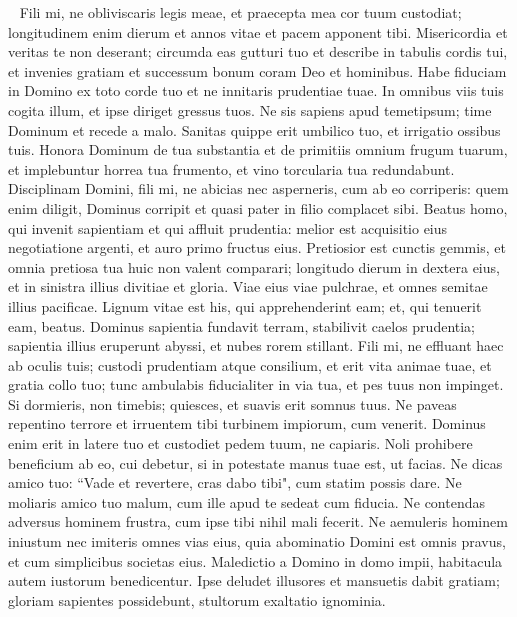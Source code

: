 \begin{biblechapter}   
\verse Fili mi, ne obliviscaris legis meae, et praecepta mea cor tuum custodiat; 
\verse longitudinem enim dierum et annos vitae et pacem apponent tibi. 
\verse Misericordia et veritas te non deserant; circumda eas gutturi tuo et describe in tabulis cordis tui, 
\verse et invenies gratiam et successum bonum coram Deo et hominibus. 
\verse Habe fiduciam in Domino ex toto corde tuo et ne innitaris prudentiae tuae. 
\verse In omnibus viis tuis cogita illum, et ipse diriget gressus tuos. 
\verse Ne sis sapiens apud temetipsum; time Dominum et recede a malo. 
\verse Sanitas quippe erit umbilico tuo, et irrigatio ossibus tuis. 
\verse Honora Dominum de tua substantia et de primitiis omnium frugum tuarum, 
\verse et implebuntur horrea tua frumento, et vino torcularia tua redundabunt. 
\verse Disciplinam Domini, fili mi, ne abicias nec asperneris, cum ab eo corriperis: 
\verse quem enim diligit, Dominus corripit et quasi pater in filio complacet sibi. 
\verse Beatus homo, qui invenit sapientiam et qui affluit prudentia: 
\verse melior est acquisitio eius negotiatione argenti, et auro primo fructus eius. 
\verse Pretiosior est cunctis gemmis, et omnia pretiosa tua huic non valent comparari; 
\verse longitudo dierum in dextera eius, et in sinistra illius divitiae et gloria. 
\verse Viae eius viae pulchrae, et omnes semitae illius pacificae. 
\verse Lignum vitae est his, qui apprehenderint eam; et, qui tenuerit eam, beatus. 
\verse Dominus sapientia fundavit terram, stabilivit caelos prudentia; 
\verse sapientia illius eruperunt abyssi, et nubes rorem stillant. 
\verse Fili mi, ne effluant haec ab oculis tuis; custodi prudentiam atque consilium, 
\verse et erit vita animae tuae, et gratia collo tuo; 
\verse tunc ambulabis fiducialiter in via tua, et pes tuus non impinget. 
\verse Si dormieris, non timebis; quiesces, et suavis erit somnus tuus. 
\verse Ne paveas repentino terrore et irruentem tibi turbinem impiorum, cum venerit. 
\verse Dominus enim erit in latere tuo et custodiet pedem tuum, ne capiaris. 
\verse Noli prohibere beneficium ab eo, cui debetur, si in potestate manus tuae est, ut facias. 
\verse Ne dicas amico tuo: “Vade et revertere, cras dabo tibi", cum statim possis dare. 
\verse Ne moliaris amico tuo malum, cum ille apud te sedeat cum fiducia. 
\verse Ne contendas adversus hominem frustra, cum ipse tibi nihil mali fecerit. 
\verse Ne aemuleris hominem iniustum nec imiteris omnes vias eius, 
\verse quia abominatio Domini est omnis pravus, et cum simplicibus societas eius. 
\verse Maledictio a Domino in domo impii, habitacula autem iustorum benedicentur. 
\verse Ipse deludet illusores et mansuetis dabit gratiam; 
\verse gloriam sapientes possidebunt, stultorum exaltatio ignominia. 
\end{biblechapter}


